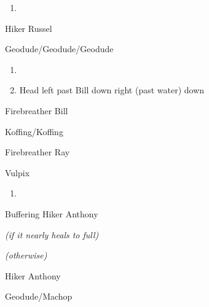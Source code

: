 \begin{paracol}{2}
\switchcolumn
\begin{enumerate}[resume]
	\item {}
\end{enumerate}

\begin{trainer}{Hiker Russel}
	\varwb
	\begin{fightSection}{Geodude/Geodude/Geodude}
		\item {} \waterGun
	\end{fightSection}
	\varwe
\end{trainer}

\switchcolumnTwice[*]
\begin{enumerate}[resume]
	\item {}
	\item Head left past Bill \pointRight{} down \pointRight{} right (past water) \pointRight{} down
\end{enumerate}

\switchcolumn
\begin{trainer}{Firebreather Bill}
	\varwb
	\begin{fightSection}{Koffing/Koffing}
		\item {} \waterGun
	\end{fightSection}
	\varwe
\end{trainer}

\switchcolumn
\begin{trainer}{Firebreather Ray}
	\varwb
	\begin{fightSection}{Vulpix}
		\item {} \waterGun
		\item {} \scratch
	\end{fightSection}
	\varwe
\end{trainer}

\switchcolumnTwice[*]
\begin{enumerate}[resume]
	\item {}
\end{enumerate}

\begin{menu}{Buffering Hiker Anthony}
	\varwb
	\begin{packMenu}
		\item \textbf{\potion{}} \textit{(if it nearly heals to full)}
		\begin{notes}
			\small{\item \textbf{\superPotion{}} \textit{(otherwise)}}
		\end{notes}
		\item {}
	\end{packMenu}
	\varwe
\end{menu}

\switchcolumn
\alignBoxes
\begin{trainer}{Hiker Anthony}
	\varwb
	\begin{fightSection}{Geodude/Machop}
		\item {} \waterGun
	\end{fightSection}
	\varwe
\end{trainer}

\end{paracol}
\vspace{3.5mm}